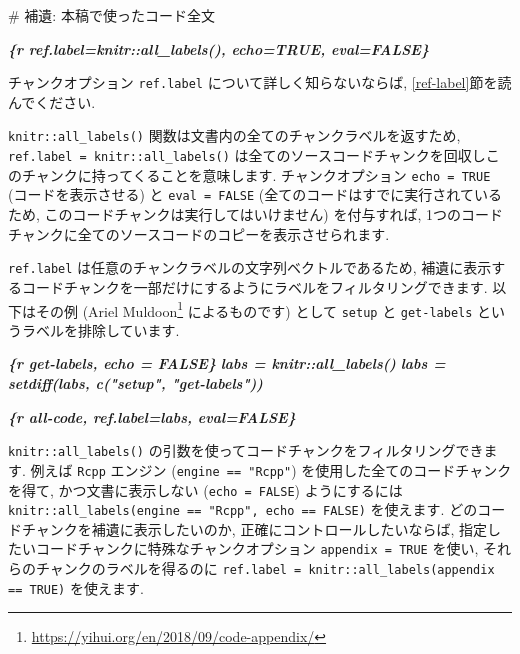 \documentclass[
  11pt,
  lualatex,ja=standard,jafont=noto]{bxjsreport}
\newenvironment{Shaded}{\begin{snugshade}}{\end{snugshade}}
\newcommand{\FunctionTok}[1]{\textcolor[rgb]{0.00,0.00,0.00}{#1}}
\newcommand{\InformationTok}[1]{\textcolor[rgb]{0.56,0.35,0.01}{\textbf{\textit{#1}}}}
\renewcommand{\href}[2]{#2\footnote{\url{#1}}}
\begin{document}
\begin{Shaded}
\begin{Highlighting}[]
\FunctionTok{\# 補遺: 本稿で使ったコード全文}

\InformationTok{\textasciigrave{}\textasciigrave{}\textasciigrave{}\{r ref.label=knitr::all\_labels(), echo=TRUE, eval=FALSE\}}
\InformationTok{\textasciigrave{}\textasciigrave{}\textasciigrave{}}
\end{Highlighting}
\end{Shaded}

チャンクオプション \texttt{ref.label} について詳しく知らないならば, \ref{ref-label}節を読んでください.

\texttt{knitr::all\_labels()} 関数は文書内の全てのチャンクラベルを返すため, \texttt{ref.label = knitr::all\_labels()} は全てのソースコードチャンクを回収しこのチャンクに持ってくることを意味します. チャンクオプション \texttt{echo = TRUE} (コードを表示させる) と \texttt{eval = FALSE} (全てのコードはすでに実行されているため, このコードチャンクは実行してはいけません) を付与すれば, 1つのコードチャンクに全てのソースコードのコピーを表示させられます.

\texttt{ref.label} は任意のチャンクラベルの文字列ベクトルであるため, 補遺に表示するコードチャンクを一部だけにするようにラベルをフィルタリングできます. 以下はその例 (\href{https://yihui.org/en/2018/09/code-appendix/}{Ariel Muldoon} によるものです) として \texttt{setup} と \texttt{get-labels} というラベルを排除しています.

\begin{Shaded}
\begin{Highlighting}[]
\InformationTok{\textasciigrave{}\textasciigrave{}\textasciigrave{}\{r get{-}labels, echo = FALSE\}}
\InformationTok{labs = knitr::all\_labels()}
\InformationTok{labs = setdiff(labs, c("setup", "get{-}labels"))}
\InformationTok{\textasciigrave{}\textasciigrave{}\textasciigrave{}}

\InformationTok{\textasciigrave{}\textasciigrave{}\textasciigrave{}\{r all{-}code, ref.label=labs, eval=FALSE\}}
\InformationTok{\textasciigrave{}\textasciigrave{}\textasciigrave{}}
\end{Highlighting}
\end{Shaded}

\texttt{knitr::all\_labels()} の引数を使ってコードチャンクをフィルタリングできます. 例えば \texttt{Rcpp} エンジン (\texttt{engine == "Rcpp"}) を使用した全てのコードチャンクを得て, かつ文書に表示しない (\texttt{echo = FALSE}) ようにするには \texttt{knitr::all\_labels(engine == "Rcpp", echo == FALSE)} を使えます. どのコードチャンクを補遺に表示したいのか, 正確にコントロールしたいならば, 指定したいコードチャンクに特殊なチャンクオプション \texttt{appendix = TRUE} を使い, それらのチャンクのラベルを得るのに \texttt{ref.label = knitr::all\_labels(appendix == TRUE)} を使えます.
\end{document}

